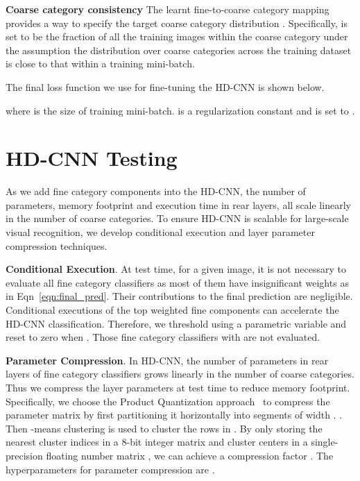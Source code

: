\documentclass[10pt,twocolumn,letterpaper]{article}
\begin{document}
\noindent \textbf{Coarse category consistency} The learnt fine-to-coarse category mapping  provides a way to specify the target coarse category distribution . Specifically,  is set to be the fraction of all the training images within the coarse category  under the assumption the distribution over coarse categories across the training dataset is close to that within a training mini-batch.

\vspace{-0.5em}


The final loss function we use for fine-tuning the HD-CNN is shown below.

\vspace{-0.5em}

where  is the size of training mini-batch.  is a regularization constant and is set to .  




\section{HD-CNN Testing}
\label{sec:hdcnn_testing}
As we add fine category components into the HD-CNN, the number of parameters, memory footprint and  execution time in rear layers,  all scale linearly in the number of coarse categories. 
To ensure HD-CNN is scalable for large-scale visual recognition, we develop conditional execution and layer parameter compression techniques.

\noindent \textbf{Conditional Execution}. At test time, for a given image, it is not necessary to evaluate all fine category classifiers as most of them have insignificant weights  as in Eqn~\ref{eqn:final_pred}. Their contributions to the final prediction are negligible. Conditional executions of the top weighted fine components can accelerate the HD-CNN classification. Therefore, we threshold  using a parametric variable  and reset  to zero when . Those fine category classifiers with  are not evaluated.

\noindent \textbf{Parameter Compression}. In HD-CNN, the number of parameters in rear layers of fine category classifiers grows linearly in the number of coarse categories. Thus we compress the layer parameters at test time to reduce memory footprint. Specifically, we choose the Product Quantization approach~\cite{jegou2011product} to compress the parameter matrix  by first partitioning it horizontally into segments of width . . Then -means clustering is used to cluster the rows in . By only storing the nearest cluster indices in a 8-bit integer matrix  and cluster centers in a single-precision floating number matrix , we can achieve a compression factor . The hyperparameters for parameter compression are .
\end{document}
